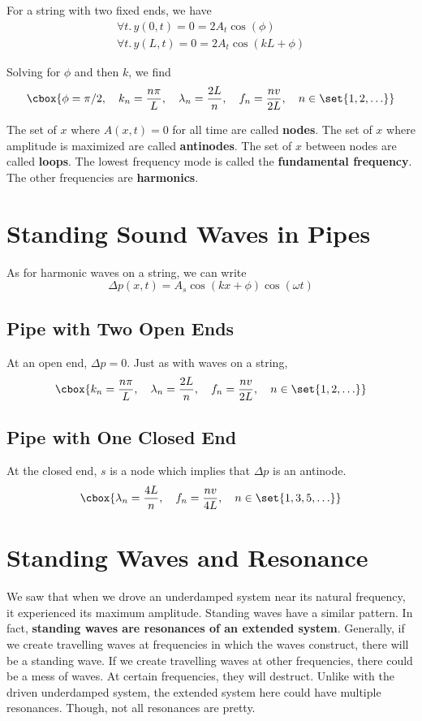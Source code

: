 \documentclass{hw}
\renewcommand\emph[1]{{\bf\color{BlueViolet}#1}}
\begin{document}
For a string with two fixed ends, we have
\begin{gather*}
  \forall t.\, y(0, t) = 0 = 2 A_t \cos(\phi) \\
  \forall t.\, y(L, t) = 0 = 2 A_t \cos(kL + \phi)
\end{gather*}

Solving for $\phi$ and then $k$, we find
\[\cbox{
  \phi = \pi/2, \quad
  k_n = \frac{n\pi}{L}, \quad
  \lambda_n = \frac{2L}{n}, \quad
  f_n = \frac{nv}{2L}, \quad
  n \in \set{1, 2, \ldots}
}\]

The set of $x$ where $A(x,t) = 0$ for all time are called \emph{nodes}. The set
of $x$ where amplitude is maximized are called \emph{antinodes}. The set of $x$
between nodes are called \emph{loops}. The lowest frequency mode is called the
\emph{fundamental frequency}. The other frequencies are \emph{harmonics}.

\section{Standing Sound Waves in Pipes}
As for harmonic waves on a string, we can write
\[
  \Delta p(x, t) = A_s \cos(kx + \phi) \cos(\omega t)
\]

\subsection{Pipe with Two Open Ends}
At an open end, $\Delta p = 0$. Just as with waves on a string,
\[\cbox{
  k_n = \frac{n\pi}{L}, \quad
  \lambda_n = \frac{2L}{n}, \quad
  f_n = \frac{nv}{2L}, \quad
  n \in \set{1, 2, \ldots}
}\]

\subsection{Pipe with One Closed End}
At the closed end, $s$ is a node which implies that $\Delta p$ is an antinode.
\[\cbox{
  \lambda_n = \frac{4L}{n}, \quad
  f_n = \frac{nv}{4L}, \quad
  n \in \set{1, 3, 5, \ldots}
}\]

\section{Standing Waves and Resonance}
We saw that when we drove an underdamped system near its natural frequency, it
experienced its maximum amplitude. Standing waves have a similar pattern. In
fact, \emph{standing waves are resonances of an extended system}. Generally, if
we create travelling waves at frequencies in which the waves construct, there
will be a standing wave. If we create travelling waves at other frequencies,
there could be a mess of waves. At certain frequencies, they will destruct.
Unlike with the driven underdamped system, the extended system here could have
multiple resonances. Though, not all resonances are pretty.
\end{document}
